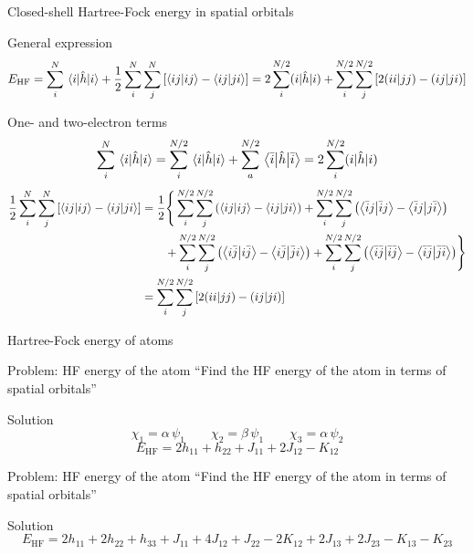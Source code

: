 \documentclass[aspectratio=169,9pt]{beamer}
\newcommand{\EHF}{E_\text{HF}}
\newcommand{\hh}{\hat{h}}
\newcommand{\violet}[1]{\textcolor{hfViolet}{#1}}
\begin{document}
\begin{frame}{Closed-shell Hartree-Fock energy in spatial orbitals}
	\begin{block}{General expression}
		\begin{equation}
			\EHF 
			= \sum_i^N \mel{i}{\hh}{i} + \frac{1}{2} \sum_i^N \sum_j^N \qty[ \braket{ij}{ij} - \braket{ij}{ji} ]
			= 2 \sum_i^{N/2} (i|\hh|i) + \sum_i^{N/2} \sum_j^{N/2} \qty[ 2(ii|jj) - (ij|ji) ]
		\end{equation}
	\end{block}
	\begin{block}{One- and two-electron terms}
		\small
		\begin{equation}
			\sum_i^N \mel{i}{\hh}{i} = \sum_i^{N/2} \mel{i}{\hh}{i} + \sum_a^{N/2} \mel{\Bar{i}}{\hh}{\Bar{i}} = 2 \sum_i^{N/2} (i|\hh|i)
		\end{equation}
		\begin{equation}
		\begin{split}
			\frac{1}{2} \sum_i^N \sum_j^N \qty[ \braket{ij}{ij} - \braket{ij}{ji} ]
			& = \frac{1}{2} \Bigg\{  
				  \sum_i^{N/2} \sum_j^{N/2} \qty( \braket{ij}{ij} - \braket{ij}{ji} )
				+ \sum_i^{N/2} \sum_j^{N/2} \qty( \braket{\Bar{i}j}{\Bar{i}j} - \braket{\Bar{i}j}{j\Bar{i}} )
				\\
				& \qquad + \sum_i^{N/2}  \sum_j^{N/2} \qty( \braket{i\Bar{j}}{i\Bar{j}} - \braket{i\Bar{j}}{\Bar{j}i} )
				+ \sum_i^{N/2}  \sum_j^{N/2} \qty( \braket{\Bar{i}\Bar{j}}{\Bar{i}\Bar{j}} - \braket{\Bar{i}\Bar{j}}{\Bar{j}\Bar{i}} )
				\Bigg\}
			\\
			& = \sum_i^{N/2} \sum_j^{N/2} \qty[ 2(ii|jj) - (ij|ji) ]
		\end{split}
		\end{equation}
	\end{block}	
\end{frame}


\begin{frame}{Hartree-Fock energy of atoms}
	\begin{block}{Problem: HF energy of the  atom}
		\violet{``Find the HF energy of the \ce{Li} atom in terms of spatial orbitals''}
	\end{block}
	\pause
	\begin{block}{Solution}
		$$ \chi_1 = \alpha \, \psi_1 \qquad \chi_2 = \beta \, \psi_1
		\qquad \chi_3 = \alpha \, \psi_2 $$
		\begin{equation*}
			E_\text{HF} = 2 h_{11} + h_{22} + J_{11} + 2J_{12} - K_{12}
		\end{equation*}
	\end{block}
	\pause
	\begin{block}{Problem: HF energy of the  atom}
		\violet{``Find the HF energy of the \ce{B} atom in terms of spatial orbitals''}
	\end{block}
	\pause
	\begin{block}{Solution}
		$$ E_\text{HF} = 2h_{11} + 2h_{22} + h_{33} + J_{11} + 4J_{12} + J_{22} - 2K_{12} + 2J_{13} + 2J_{23} - K_{13} - K_{23}$$
	\end{block}
\end{frame}
\end{document}
